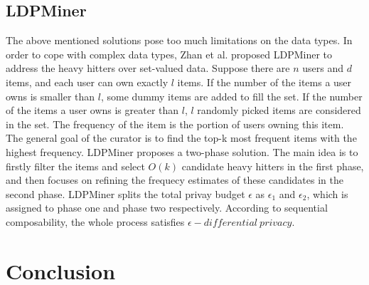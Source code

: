 \documentclass[a4paper, 11pt]{article} %
\theoremstyle{definition}
\begin{document}
\subsection{LDPMiner}
The above mentioned solutions pose too much limitations on the data types. In order to cope with complex data types, Zhan et al. proposed LDPMiner\cite{qin2016heavy} to address the heavy hitters over set-valued data. Suppose there are $n$ users and $d$ items, and each user can own exactly $l$ items. If the number of the items a user owns is smaller than $l$, some dummy items are added to fill the set. If the number of the items a user owns is greater than $l$, $l$ randomly picked items are considered in the set. The frequency of the item is the portion of users owning this item. The general goal of the curator is to find the top-k most frequent items with the highest frequency. LDPMiner proposes a two-phase solution. The main idea is to firstly filter the items and select $O(k)$ candidate heavy hitters in the first phase, and then focuses on refining the frequecy estimates of these candidates in the second phase. LDPMiner splits the total privay budget $\epsilon$ as $\epsilon_1$ and $\epsilon_2$, which is assigned to phase one and phase two respectively. According to sequential composability\cite{mcsherry2009privacy}, the whole process satisfies $\epsilon - differential \ privacy$.

\section*{Conclusion}










\end{document}
